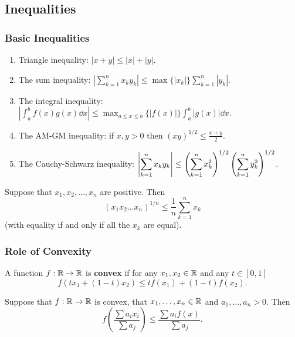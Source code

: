 \subsection{Inequalities}

\subsubsection{Basic Inequalities}
\begin{enumerate}
    \item Triangle inequality: \(|x + y| \leq |x| + |y|\).
    \item The sum inequality: \(\displaystyle{\left|\sum_{k=1}^n x_ky_k\right| \leq \max\{|x_k|\} \sum_{k=1}^n |y_k|}\).
    \item The integral inequality: \(\displaystyle{\left|\int_a^b f(x)g(x) \dd{x} \right| \leq \max_{a \leq x \leq b}\{|f(x)|\} \int_a^b |g(x)| \dd{x}}\).
    \item The AM-GM inequality: if \(x, y > 0\) then \(\displaystyle{(xy)^{1/2} \leq \frac{x + y}{2}}\).
    \item The Cauchy-Schwarz inequality: \(\displaystyle{\abs{\sum_{k=1}^{n} x_k y_k} \leq \left(\sum_{k=1}^{n} x_k^2\right)^{1/2} \left(\sum_{k=1}^{n}y_k^2 \right)^{1/2}}\).
\end{enumerate}

\begin{theorem}
    Suppose that \(x_1, x_2, \dots, x_n\) are positive. Then
    \[(x_1x_2\dots x_n)^{1/n} \leq \frac{1}{n}\sum_{k=1}^{n}x_k\]
    (with equality if and only if all the \(x_k\) are equal).
\end{theorem}

\subsubsection{Role of Convexity}
\begin{definition}
    A function \(f : \mathbb{R} \to \mathbb{R}\) is \textbf{convex} if for any \(x_1, x_2 \in \mathbb{R}\) and any \(t \in [0, 1]\)
    \[f(tx_1 + (1 - t)x_2) \leq tf(x_1) + (1 - t)f(x_2).\]
\end{definition}

\begin{theorem}
    Suppose that \(f: \mathbb{R} \to \mathbb{R}\) is convex, that \(x_1, \dots, x_n \in \mathbb{R}\) and \(a_1, \dots, a_n > 0\). Then
    \[f\left(\frac{\sum a_i x_i}{\sum a_j}\right) \leq \frac{\sum a_i f(x)}{\sum a_j}.\]
\end{theorem}

